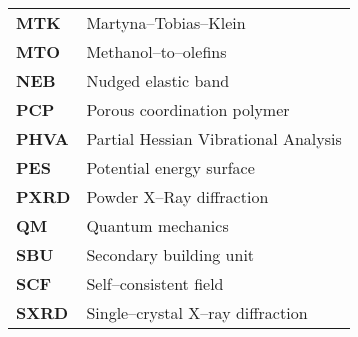 \begin{longtable}{p{} p{}}
\textbf{MTK} & Martyna--Tobias--Klein \\
\textbf{MTO} & Methanol--to--olefins \\
\textbf{NEB} & Nudged elastic band \\
\textbf{PCP} & Porous coordination polymer \\
\textbf{PHVA} & Partial Hessian Vibrational Analysis \\
\textbf{PES} & Potential energy surface \\
\textbf{PXRD} & Powder X--Ray diffraction\\
\textbf{QM} & Quantum mechanics \\
\textbf{SBU} & Secondary building unit \\
\textbf{SCF} & Self--consistent field\\
\textbf{SXRD} & Single--crystal X--ray diffraction\\

\end{longtable}
